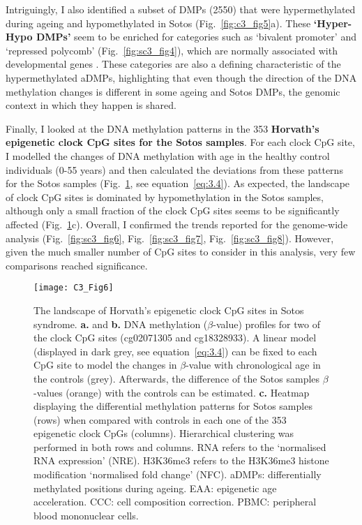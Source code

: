 Intriguingly, I also identified a subset of DMPs (2550) that were hypermethylated during ageing and hypomethylated in Sotos (Fig.~\ref{fig:c3_fig5}a). These \textbf{`Hyper-Hypo DMPs'} seem to be enriched for categories such as `bivalent promoter' and `repressed polycomb' (Fig.~\ref{fig:sc3_fig4}), which are normally associated with developmental genes \citep{Bernstein2006,Bernhart2016}. These categories are also a defining characteristic of the hypermethylated aDMPs, highlighting that even though the direction of the DNA methylation changes is different in some ageing and Sotos DMPs, the genomic context in which they happen is shared.

\bigskip

Finally, I looked at the DNA methylation patterns in the 353 \textbf{Horvath's epigenetic clock CpG sites for the Sotos samples}. For each clock CpG site, I modelled the changes of DNA methylation with age in the healthy control individuals (0-55 years) and then calculated the deviations from these patterns for the Sotos samples (Fig.~\ref{fig:c3_fig6}, see equation~\ref{eq:3.4}). As expected, the landscape of clock CpG sites is dominated by hypomethylation in the Sotos samples, although only a small fraction of the clock CpG sites seems to be significantly affected (Fig.~\ref{fig:c3_fig6}c). Overall, I confirmed the trends reported for the genome-wide analysis (Fig.~\ref{fig:sc3_fig6}, Fig.~\ref{fig:sc3_fig7}, Fig.~\ref{fig:sc3_fig8}). However, given the much smaller number of CpG sites to consider in this analysis, very few comparisons reached significance.

\begin{figure}[htbp!] 
	\centering    
	\texttt{[image: C3\_Fig6]}
	\vspace*{1 mm}
	\caption[Landscape of Horvath's epigenetic clock CpGs in Sotos syndrome]{The landscape of Horvath's epigenetic clock CpG sites in Sotos syndrome. \textbf{a.} and \textbf{b.} DNA methylation ($\beta$-value) profiles for two of the clock CpG sites (cg02071305 and cg18328933). A linear model (displayed in dark grey, see equation~\ref{eq:3.4}) can be fixed to each CpG site to model the changes in $\beta$-value with chronological age in the controls (grey). Afterwards, the difference of the Sotos samples $\beta$-values (orange) with the controls can be estimated. \textbf{c.} Heatmap displaying the differential methylation patterns for Sotos samples (rows) when compared with controls in each one of the 353 epigenetic clock CpGs (columns). Hierarchical clustering was performed in both rows and columns. RNA refers to the `normalised RNA expression' (NRE). H3K36me3 refers to the H3K36me3 histone modification `normalised fold change' (NFC). aDMPs: differentially methylated positions during ageing. EAA: epigenetic age acceleration. CCC: cell composition correction. PBMC: peripheral blood mononuclear cells.}
	\label{fig:c3_fig6}
\end{figure}

